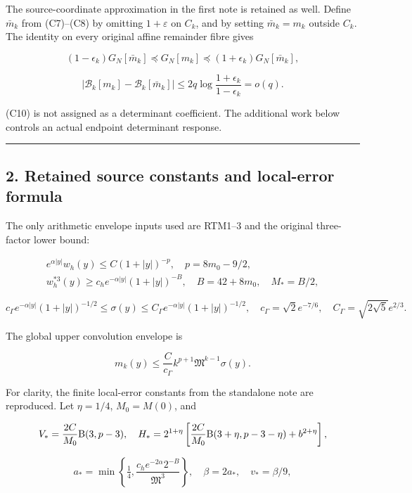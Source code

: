 The source-coordinate approximation in the first note is retained as well. Define \(\bar m_k\) from (C7)--(C8) by omitting \(1+\varepsilon\) on \(C_k\), and by setting \(\bar m_k=m_k\) outside \(C_k\). The identity on every original affine remainder fibre gives

\[
(1-\epsilon_k)G_N[\bar m_k]\preceq G_N[m_k]
\preceq(1+\epsilon_k)G_N[\bar m_k],
\]

\[
|\mathcal B_k[m_k]-\mathcal B_k[\bar m_k]|
\le2q\log\frac{1+\epsilon_k}{1-\epsilon_k}=o(q).
\tag{C11}
\]

(C10) is not assigned as a determinant coefficient. The additional work below controls an actual endpoint determinant response.

\begin{center}\rule{0.5\linewidth}{0.5pt}\end{center}

\subsection{2. Retained source constants and local-error formula}\label{loc:retained-source-constants-and-local-error-formula}

The only arithmetic envelope inputs used are RTM1--3 and the original three-factor lower bound:

\[
\begin{gathered}
e^{\alpha|y|}w_h(y)\le C(1+|y|)^{-p},\quad
p=8m_0-9/2,\\
w_h^{*3}(y)\ge c_h e^{-\alpha|y|}(1+|y|)^{-B},
\quad B=42+8m_0,\quad M_*=B/2,
\end{gathered}\tag{L1}
\]

\[
c_\Gamma e^{-\alpha|y|}(1+|y|)^{-1/2}\le\sigma(y)
\le C_\Gamma e^{-\alpha|y|}(1+|y|)^{-1/2},
\quad c_\Gamma=\sqrt2e^{-7/6},\quad C_\Gamma=\sqrt{2\sqrt5}e^{2/3}.
\]

The global upper convolution envelope is

\[
m_k(y)\le\frac C{c_\Gamma}k^{p+1}\mathfrak M^{k-1}\sigma(y).
\tag{L2}
\]

For clarity, the finite local-error constants from the standalone note are reproduced. Let \(\eta=1/4\), \(M_0=M(0)\), and

\[
V_* =\frac{2C}{M_0}{\rm B}(3,p-3),\quad
H_* =2^{1+\eta}\left[\frac{2C}{M_0}{\rm B}(3+\eta,p-3-\eta)+b^{2+\eta}\right],
\]

\[
a_* =\min\left\{\tfrac14,\frac{c_he^{-2\alpha}2^{-B}}{\mathfrak M^3}\right\},
\quad\beta=2a_*,\quad v_*=\beta/9,
\]

